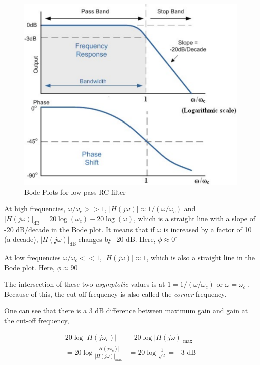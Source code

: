 \begin{figure}[H]
    \centering
    \includegraphics[width=1\columnwidth]{images/f7.png}
    \caption{Bode Plots for low-pass RC filter}
    \label{fig:2}
\end{figure}

At high frequencies, $\omega/\omega_c>>1$, $|H(j\omega)| \approx 1/(\omega/\omega_c)$ and $|H(j\omega)|_\text{dB} = 20\log(\omega_c)-20 \log(\omega)$, which is a straight line with a slope of -20 dB/decade in the Bode plot. It means that if $\omega$ is increased by a factor of 10 (a decade), $|H(j\omega)|_\text{dB}$ changes by -20 dB. Here, $\phi \approx 0^{\circ}$

At low frequencies $\omega/\omega_c<<1$, $|H(j\omega)| \approx 1$, which is also a straight line in the Bode plot. Here, $\phi \approx 90^{\circ}$

The intersection of these two \textit{asymptotic} values is at $1 =  1/(\omega/\omega_c)$ or $\omega = \omega_c$ . Because of this, the cut-off frequency is also called the \textit{corner} frequency.

One can see that there is a 3 dB difference between maximum gain and gain at the cut-off frequency,

\begin{align*}
    20\log|H(j\omega_c)|&-20\log|H(j\omega)|_\text{max}\\
    = 20\log \frac{|H(j\omega_c)|}{|H(j\omega)|_\text{max}} &= 20\log\frac{1}{\sqrt{2}} = -3 \text{ dB}
\end{align*}

